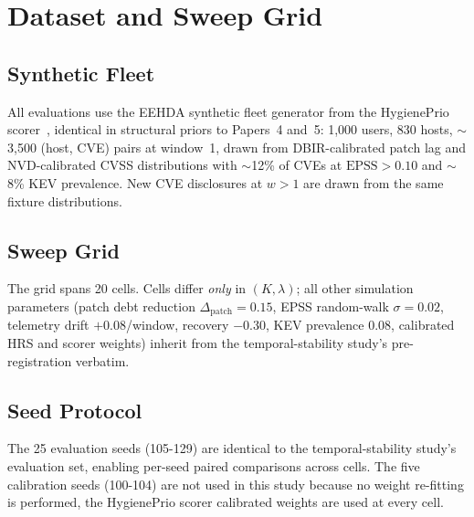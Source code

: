 \section{Dataset and Sweep Grid}

\subsection{Synthetic Fleet}

All evaluations use the EEHDA synthetic fleet generator from
the HygienePrio scorer~\cite{paper4hygieneprio}, identical in structural priors to
Papers~4 and~5: 1{,}000 users, 830 hosts, $\sim$3{,}500 (host, CVE) pairs
at window~1, drawn from DBIR-calibrated patch lag and NVD-calibrated CVSS
distributions with $\sim$12\% of CVEs at $\mathrm{EPSS} > 0.10$ and $\sim$8\%
KEV prevalence. New CVE disclosures at $w > 1$ are drawn from the same
fixture distributions.

\subsection{Sweep Grid}



The grid spans 20 cells. Cells differ \textit{only} in $(K, \lambda)$;
all other simulation parameters (patch debt reduction $\Delta_{\mathrm{patch}} =
0.15$, EPSS random-walk $\sigma = 0.02$, telemetry drift $+0.08$/window,
recovery $-0.30$, KEV prevalence $0.08$, calibrated HRS and scorer
weights) inherit from the temporal-stability study's pre-registration verbatim.

\subsection{Seed Protocol}

The 25 evaluation seeds (105-129) are identical to the temporal-stability study's evaluation
set, enabling per-seed paired comparisons across cells. The five
calibration seeds (100-104) are not used in this study because no
weight re-fitting is performed, the HygienePrio scorer calibrated weights are
used at every cell.
